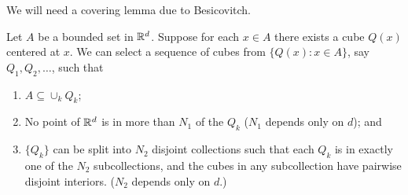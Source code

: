 

We will need a covering lemma due to Besicovitch.

\begin{theorem}\label{thm:ch5_4.4}
Let $A$ be a bounded set in $\mathbb{R}^d$. Suppose for each $x \in A$ there exists a cube $Q(x)$ centered at $x$. We can select a sequence of cubes from $\{Q(x) : x \in A\}$, say $Q_1,Q_2,\ldots$, such that
\begin{enumerate}[wide, labelindent=0em, labelwidth=\parindent, labelsep = 0em]
    \item $A \subseteq \cup_k Q_k$;
    \item No point of $\mathbb{R}^d$ is in more than $N_1$ of the $Q_k$ ($N_1$ depends only on $d$); and
    \item $\{Q_k\}$ can be split into $N_2$ disjoint collections such that each $Q_k$ is in exactly one of the $N_2$ subcollections, and the cubes in any subcollection have pairwise disjoint interiors. ($N_2$ depends only on $d$.)
\end{enumerate}
\end{theorem}

